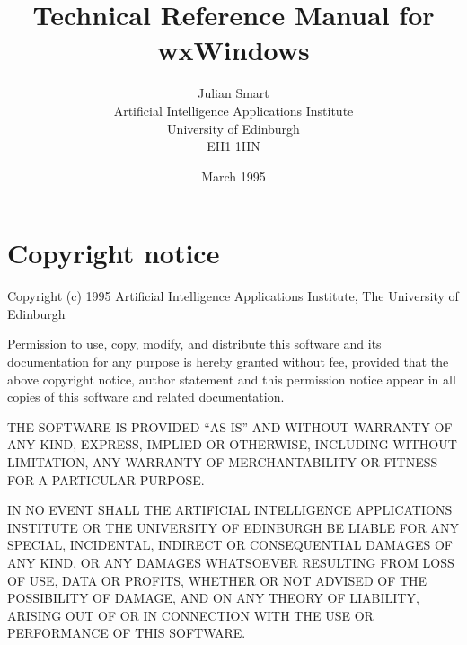 


\parskip=10pt
\parindent=0pt
\title{Technical Reference Manual for wxWindows}
\author{Julian Smart\\Artificial Intelligence Applications Institute\\
University of Edinburgh\\EH1 1HN}
\date{March 1995}

\makeindex

\maketitle

\pagestyle{fancyplain}

\setfooter{\thepage}{}{}{}{}{\thepage}
\tableofcontents

\chapter*{Copyright notice}
%
\setfooter{\thepage}{}{}{}{}{\thepage}

\begin{center}
Copyright (c) 1995 Artificial Intelligence Applications Institute,
The University of Edinburgh\\
\end{center}

Permission to use, copy, modify, and distribute this software and its
documentation for any purpose is hereby granted without fee, provided that the
above copyright notice, author statement and this permission notice appear in
all copies of this software and related documentation.

THE SOFTWARE IS PROVIDED ``AS-IS'' AND WITHOUT WARRANTY OF ANY KIND, EXPRESS,
IMPLIED OR OTHERWISE, INCLUDING WITHOUT LIMITATION, ANY WARRANTY OF
MERCHANTABILITY OR FITNESS FOR A PARTICULAR PURPOSE.

IN NO EVENT SHALL THE ARTIFICIAL INTELLIGENCE APPLICATIONS INSTITUTE OR THE
UNIVERSITY OF EDINBURGH BE LIABLE FOR ANY SPECIAL, INCIDENTAL, INDIRECT OR
CONSEQUENTIAL DAMAGES OF ANY KIND, OR ANY DAMAGES WHATSOEVER RESULTING FROM
LOSS OF USE, DATA OR PROFITS, WHETHER OR NOT ADVISED OF THE POSSIBILITY OF
DAMAGE, AND ON ANY THEORY OF LIABILITY, ARISING OUT OF OR IN CONNECTION WITH
THE USE OR PERFORMANCE OF THIS SOFTWARE.

